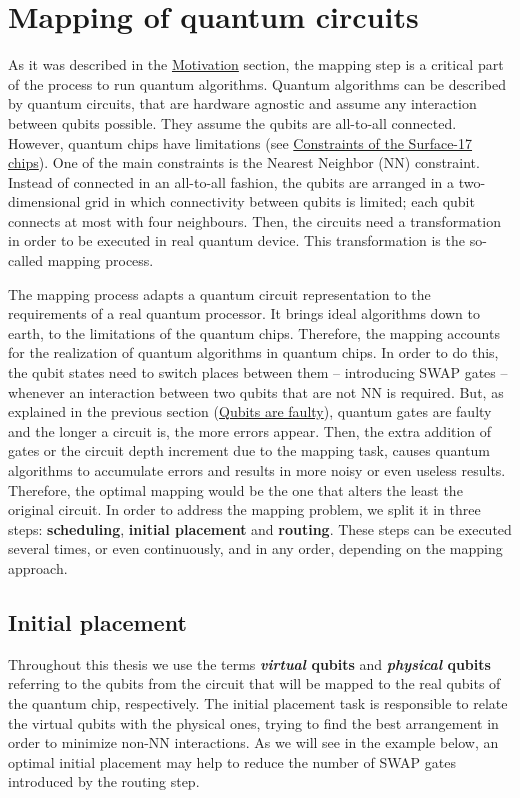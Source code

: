 \section{Mapping of quantum circuits}
\label{sec:orgd680d43}
As it was described in the \href{chapter-1.org}{Motivation} section, the mapping step is a critical part of the process to run quantum algorithms.
Quantum algorithms can be described by quantum circuits, that are hardware agnostic and assume any interaction between qubits possible.
They assume the qubits are all-to-all connected.
However, quantum chips have limitations (see \href{chapter-3.org}{Constraints of the Surface-17 chips}).
One of the main constraints is the Nearest Neighbor (NN) constraint.
Instead of connected in an all-to-all fashion, the qubits are arranged in a two-dimensional grid in which connectivity between qubits is limited; each qubit connects at most with four neighbours.
Then, the circuits need a transformation in order to be executed in real quantum device.
This transformation is the so-called mapping process.

The mapping process adapts a quantum circuit representation to the requirements of a real quantum processor.
It brings ideal algorithms down to earth, to the limitations of the quantum chips.
Therefore, the mapping accounts for the realization of quantum algorithms in quantum chips.
In order to do this, the qubit states need to switch places between them -- introducing SWAP gates -- whenever an interaction between two qubits that are not NN is required. 
But, as explained in the previous section (\hyperref[sec:org9e13eea]{Qubits are faulty}), quantum gates are faulty and the longer a circuit is, the more errors appear.
Then, the extra addition of gates or the circuit depth increment due to the mapping task, causes quantum algorithms to accumulate errors and results in more noisy or even useless results.
Therefore, the optimal mapping would be the one that alters the least the original circuit.
In order to address the mapping problem, we split it in three steps: \textbf{scheduling}, \textbf{initial placement} and \textbf{routing}.
These steps can be executed several times, or even continuously, and in any order, depending on the mapping approach.

\subsection{Initial placement}
\label{sec:org839069b}

Throughout this thesis we use the terms \textbf{\emph{virtual} qubits} and \textbf{\emph{physical} qubits} referring to the qubits from the circuit that will be mapped to the real qubits of the quantum chip, respectively.
The initial placement task is responsible to relate the virtual qubits with the physical ones, trying to find the best arrangement in order to minimize non-NN interactions.
As we will see in the example below, an optimal initial placement may help to reduce the number of SWAP gates introduced by the routing step.

